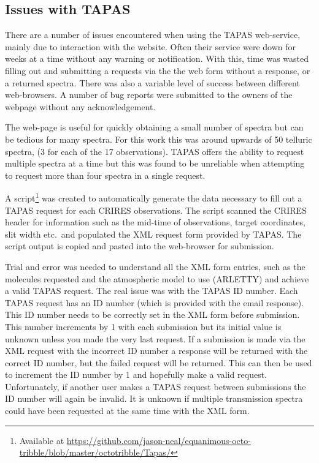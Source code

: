 \subsection{Issues with {TAPAS}}
There are a number of issues encountered when using the {TAPAS} web-service, mainly due to interaction with the website.
Often their service were down for weeks at a time without any warning or notification.
With this, time was wasted filling out and submitting a requests via the the web form without a response, or a returned spectra.
There was also a variable level of success between different web-browsers.
A number of bug reports were submitted to the owners of the webpage without any acknowledgement.

The web-page is useful for quickly obtaining a small number of spectra but can be tedious for many spectra.
For this work this was around upwards of 50 telluric spectra, (3 for each of the 17 observations). TAPAS offers the ability to request multiple spectra at a time but this was found to be unreliable when attempting to request more than four spectra in a single request.

A script\footnote{Available at \href{https://github.com/jason-neal/equanimous-octo-tribble/blob/master/octotribble/Tapas/}{https://github.com/jason-neal/equanimous-octo-tribble/blob/master/octotribble/Tapas/}} was created to automatically generate the data necessary to fill out a {TAPAS} request for each {CRIRES} observations.
The script scanned the {CRIRES} header for information such as the mid-time of observations, target coordinates, slit width etc.\ and populated the {XML} request form provided by {TAPAS}.
The script output is copied and pasted into the web-browser for submission.

Trial and error was needed to understand all the {XML} form entries, such as the molecules requested and the atmospheric model to use ({ARLETTY}) and achieve a valid {TAPAS} request.
The real issue was with the {TAPAS} {{ID}} number.
Each {TAPAS} request has an {ID} number (which is provided with the email response).
This {ID} number needs to be correctly set in the {XML} form before submission.
This number increments by 1 with each submission but its initial value is unknown unless you made the very last request.
If a submission is made via the {XML} request with the incorrect {ID} number a response will be returned with the correct {ID} number, but the failed request will be returned.
This can then be used to increment the {ID} number by 1 and hopefully make a valid request.
Unfortunately, if another user makes a {TAPAS} request between submissions the {ID} number will again be invalid.
It is unknown if multiple transmission spectra could have been requested at the same time with the {XML} form.

